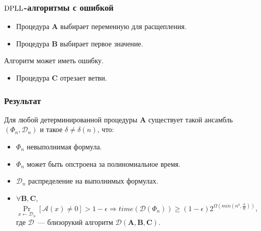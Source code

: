 \begin{frame}
	\frametitle{$\mathrm{DPLL}$-алгоритмы с ошибкой}

   	
    
	\pause
    \pause
    \pause
    \pause
    \pause
    \begin{itemize}
        \item Процедура $\mathbf{A}$ выбирает переменную для расщепления.
    	\pause
	    \item Процедура $\mathbf{B}$ выбирает первое значение.
    \end{itemize}

    \pause
    Алгоритм может иметь ошибку.

    \pause
    \pause
    \begin{itemize}
	    \item Процедура $\mathbf{C}$ отрезает ветви.
    \end{itemize}
\end{frame}


\begin{frame}
	\frametitle{Результат}
	\pause
	\begin{theorem}
        Для любой детерминированной процедуры $\mathbf{A}$ существует такой ансамбль $(\Phi_n, \mathcal{D}_n)$ и такое $\delta \ne
        \delta(n)$, что:
        \pause
		\begin{itemize}
            \item $\Phi_n$ невыполнимая формула.
        	\item $\Phi_n$ может быть опстроена за полиномиальное время.
            \pause
            \item $\mathcal{D}_n$ распределение на выполнимых формулах.
            \pause
			\item $\forall \mathbf{B}, \mathbf{C}$,
				$\Pr\limits_{x \gets \mathcal{D}_n}[\mathcal{A}(x)
                \ne 0] > 1 - \epsilon \Rightarrow
                time(\mathcal{D}(\Phi_n)) \ge (1 - \epsilon) 2^{\Omega(min(n^\delta, \frac{n}{K}))}$, где $\mathcal{D}$~---
                близорукий алгоритм $\mathcal{D}(\mathbf{A}, \mathbf{B},\mathbf{C})$.
		\end{itemize}
	\end{theorem}
\end{frame}


